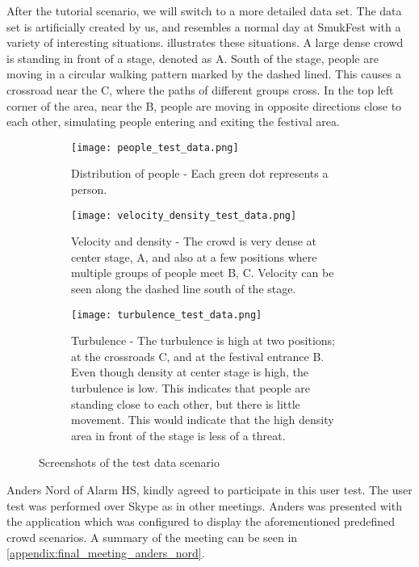 After the tutorial scenario, we will switch to a more detailed data set. The data set is artificially created by us, and resembles a normal day at SmukFest with a variety of interesting situations.  illustrates these situations. A large dense crowd is standing in front of a stage, denoted as A. South of the stage, people are moving in a circular walking pattern marked by the dashed lined. This causes a crossroad near the C, where the paths of different groups cross. In the top left corner of the area, near the B, people are moving in opposite directions close to each other, simulating people entering and exiting the festival area.

\begin{figure}[htbp]
\begin{subfigure}[t]{.49\linewidth}
    \centering
    \texttt{[image: people\_test\_data.png]}
    \caption{Distribution of people - Each green dot represents a person.}
\end{subfigure}
\enspace
\begin{subfigure}[t]{.49\linewidth}
    \centering
    \texttt{[image: velocity\_density\_test\_data.png]}
    \caption{Velocity and density - The crowd is very dense at center stage, A, and also at a few positions where multiple groups of people meet B, C. Velocity can be seen along the dashed line south of the stage.}
\end{subfigure}
\enspace
\begin{subfigure}[t]{.49\linewidth}
    \centering
    \texttt{[image: turbulence\_test\_data.png]}
    \caption{Turbulence - The turbulence is high at two positions; at the crossroads C, and at the festival entrance B. Even though density at center stage is high, the turbulence is low. This indicates that people are standing close to each other, but there is little movement. This would indicate that the high density area in front of the stage is less of a threat.}
\end{subfigure}
\caption{Screenshots of the test data scenario}
\label{fig:test_data_screens}
\end{figure}

Anders Nord of Alarm HS, kindly agreed to participate in this user test. The user test was performed over Skype as in other meetings. Anders was presented with the application which was configured to display the aforementioned predefined crowd scenarios. A summary of the meeting can be seen in \cref{appendix:final_meeting_anders_nord}.

